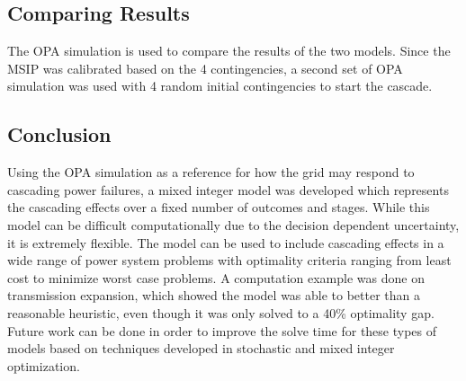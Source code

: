 \subsection{Comparing Results}
The OPA simulation is used to compare the results of the two models.  Since the MSIP was calibrated based on the 4 contingencies, a second set of OPA simulation was used with 4 random initial contingencies to start the cascade.




\subsection{Conclusion}
Using the OPA simulation as a reference for how the grid may respond to cascading power failures, a mixed integer model was developed which represents the cascading effects over a fixed number of outcomes and stages.  While this model can be difficult computationally due to the decision dependent uncertainty, it is extremely flexible.  The model can be used to include cascading effects in a wide range of power system problems with optimality criteria ranging from least cost to minimize worst case problems.  A computation example was done on transmission expansion, which showed the model was able to better than a reasonable heuristic, even though it was only solved to a 40\% optimality gap.  Future work can be done in order to improve the solve time for these types of models based on techniques developed in stochastic and mixed integer optimization.


